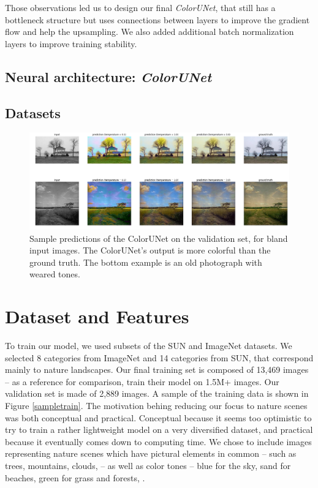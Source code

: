 \documentclass[10pt,twocolumn,letterpaper]{article}
\begin{document}
Those observations led us to design our final \textit{ColorUNet}, that still has a bottleneck structure but uses connections between layers to improve the gradient flow and help the upsampling. We also added additional batch normalization layers to improve training stability.
\subsection{Neural architecture: \textit{ColorUNet}}


\subsection{Datasets}
\begin{figure}
\begin{center}
\includegraphics[width=450px]{better}
\caption{Sample predictions of the ColorUNet on the validation set, for bland input images. The ColorUNet's output is more colorful than the ground truth. The bottom example is an old photograph with weared tones.}
\label{better}
\end{center}
\end{figure}
\section{Dataset and Features}

To train our model, we used subsets of the SUN \cite{xiao2010sun} and ImageNet \cite{russakovsky2015imagenet} datasets. We selected 8 categories from ImageNet and 14 categories from SUN, that correspond mainly to nature landscapes. Our final training set is composed of 13,469 images -- as a reference for comparison, \cite{zhang2016colorful} train their model on 1.5M+ images. Our validation set is made of 2,889 images. A sample of the training data is shown in Figure \ref{sampletrain}.
The motivation behing reducing our focus to nature scenes was both conceptual and practical. Conceptual because it seems too optimistic to try to train a rather lightweight model on a very diversified dataset, and practical because it eventually comes down to computing time. We chose to include images representing nature scenes which have pictural elements in common -- such as trees, mountains, clouds, \etc -- as well as color tones -- blue for the sky, sand for beaches, green for grass and forests,  \etc.
\end{document}
